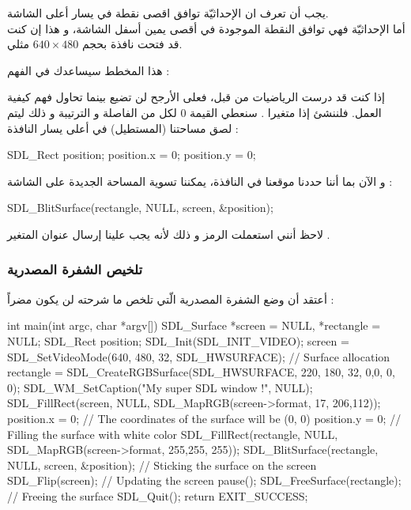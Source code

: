 يجب أن تعرف ان الإحداثيّة 
توافق اقصى نقطة في يسار أعلى الشاشة.\\
أما الإحداثيّة 
فهي توافق النقطة الموجودة في أقصى يمين أسفل الشاشة، و هذا إن كنت قد فتحت نافذة بحجم
$640 \times 480$
مثلي.

هذا المخطط سيساعدك في الفهم  :


إذا كنت قد درست الرياضيات من قبل، فعلى الأرجح لن تضيع بينما تحاول  فهم كيفية العمل. فلننشئ إذا متغيرا 
.
سنعطي القيمة 0 لكل من الفاصلة و الترتيبة و ذلك ليتم لصق مساحتنا (المستطيل) في أعلى يسار النافذة :

\begin{Csource}
SDL_Rect position;
position.x = 0;
position.y = 0;
\end{Csource}

و الآن بما أننا حددنا موقعنا في النافذة، يمكننا تسوية المساحة الجديدة على الشاشة :

\begin{Csource}
SDL_BlitSurface(rectangle, NULL, screen, &position);
\end{Csource}
 
لاحظ أنني استعملت الرمز
\InlineCode{\&}
و ذلك لأنه يجب علينا إرسال عنوان المتغير
.

\subsubsection{تلخيص الشفرة المصدرية}

أعتقد أن وضع الشفرة المصدرية الّتي تلخص ما شرحته لن يكون مضراً :

\begin{Csource}
int main(int argc, char *argv[])
{
	SDL_Surface *screen = NULL, *rectangle = NULL;
	SDL_Rect position;
	SDL_Init(SDL_INIT_VIDEO);
	screen = SDL_SetVideoMode(640, 480, 32, SDL_HWSURFACE);
	// Surface allocation
	rectangle = SDL_CreateRGBSurface(SDL_HWSURFACE, 220, 180, 32, 0,0, 0, 0);
	SDL_WM_SetCaption("My super SDL window !", NULL);
	SDL_FillRect(screen, NULL, SDL_MapRGB(screen->format, 17, 206,112));
	position.x = 0; // The coordinates of the surface will be (0, 0)
	position.y = 0;
	// Filling the surface with white color
	SDL_FillRect(rectangle, NULL, SDL_MapRGB(screen->format, 255,255, 255));
	SDL_BlitSurface(rectangle, NULL, screen, &position); // Sticking the surface on the screen 
	SDL_Flip(screen); // Updating the screen
	pause();
	SDL_FreeSurface(rectangle); // Freeing the surface
	SDL_Quit();
	return EXIT_SUCCESS;
}
\end{Csource}

